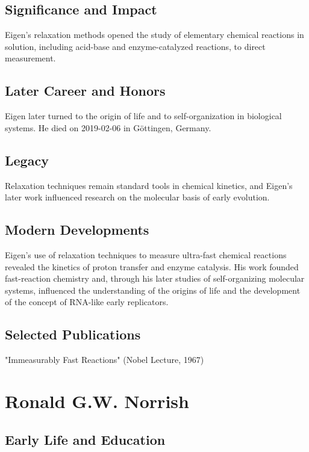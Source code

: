 \subsection*{Significance and Impact}

Eigen's relaxation methods opened the study of elementary chemical reactions in solution, including acid-base and enzyme-catalyzed reactions, to direct measurement.

\subsection*{Later Career and Honors}

Eigen later turned to the origin of life and to self-organization in biological systems. He died on 2019-02-06 in Göttingen, Germany.

\subsection*{Legacy}

Relaxation techniques remain standard tools in chemical kinetics, and Eigen's later work influenced research on the molecular basis of early evolution.

\subsection*{Modern Developments}

Eigen's use of relaxation techniques to measure ultra-fast chemical reactions revealed the kinetics of proton transfer and enzyme catalysis. His work founded fast-reaction chemistry and, through his later studies of self-organizing molecular systems, influenced the understanding of the origins of life and the development of the concept of RNA-like early replicators.

\subsection*{Selected Publications}

"Immeasurably Fast Reactions" (Nobel Lecture, 1967)

\clearpage

\section{Ronald G.W. Norrish}

\subsection*{Early Life and Education}


